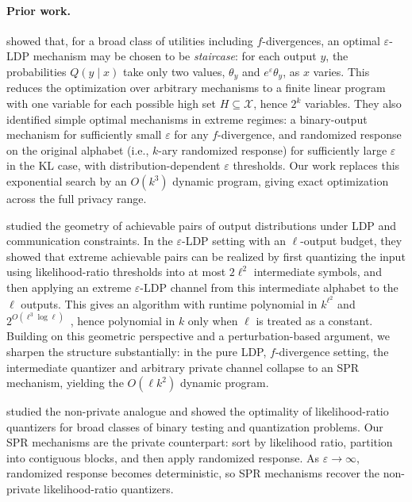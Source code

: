 \documentclass{article}
\theoremstyle{plain}
\theoremstyle{definition}
\theoremstyle{plain}
\newcommand{\eps}{\varepsilon}
\newcommand{\X}{\mathcal{X}}
\begin{document}
\paragraph{Prior work.}
\citet{Kairouz2016ExtremalMechanisms} showed that, for a broad class of utilities including $f$-divergences, an optimal $\eps$-LDP mechanism may be chosen to be \emph{staircase}: for each output $y$, the probabilities $Q(y \mid x)$ take only two values, $\theta_y$ and $e^\eps \theta_y$, as $x$ varies. This reduces the optimization over arbitrary mechanisms to a finite linear program with one variable for each possible high set $H \subseteq \X$, hence $2^k$ variables. They also identified simple optimal mechanisms in extreme regimes: a binary-output mechanism for sufficiently small $\eps$ for any $f$-divergence, and randomized response on the original alphabet (i.e., $k$-ary randomized response) for sufficiently large $\eps$ in the KL case, with distribution-dependent $\eps$ thresholds. Our work replaces this exponential search by an $O(k^3)$ dynamic program, giving exact optimization across the full privacy range.

\citet{Pensia2025BinaryTesting} studied the geometry of achievable pairs of output distributions under LDP and communication constraints. In the $\eps$-LDP setting with an $\ell$-output budget, they showed that extreme achievable pairs can be realized by first quantizing the input using likelihood-ratio thresholds into at most $2\ell^2$ intermediate symbols, and then applying an extreme $\eps$-LDP channel from this intermediate alphabet to the $\ell$ outputs. This gives an algorithm with runtime polynomial in $k^{\ell^2}$ and $2^{O(\ell^3\log \ell)}$~\cite[Corollary 4]{Pensia2025BinaryTesting}, hence polynomial in $k$ only when $\ell$ is treated as a constant. Building on this geometric perspective and a perturbation-based argument, we sharpen the structure substantially: in the pure LDP, $f$-divergence setting, the intermediate quantizer and arbitrary private channel collapse to an SPR mechanism, yielding the $O(\ell k^2)$ dynamic program.

\citet{Tsitsiklis1993ExtremalProperties} studied the non-private analogue and showed the optimality of likelihood-ratio quantizers for broad classes of binary testing and quantization problems. Our SPR mechanisms are the private counterpart: sort by likelihood ratio, partition into contiguous blocks, and then apply randomized response. As $\eps \to \infty$, randomized response becomes deterministic, so SPR mechanisms recover the non-private likelihood-ratio quantizers.
\end{document}
